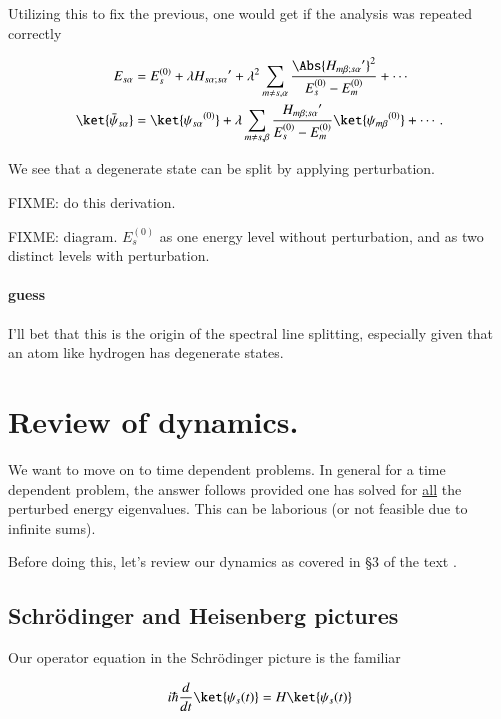 Utilizing this to fix the previous, one would get if the analysis was repeated correctly

\begin{align}\label{eqn:qmTwoL5:190}
E_{s\alpha} &= E_s^{(0)} + \lambda {H_{s\alpha ; s\alpha}}' 
+ \lambda^2 
\sum_{m \ne s, \alpha} 
\frac{\Abs{{H_{m \beta ; s \alpha}}'}^2 }
{ E_s^{(0)} - E_m^{(0)} } 
+ \cdots
\\
\ket{\bar{\psi}_{s \alpha}} &= \ket{{\psi_{s \alpha}}^{(0)}} 
+ \lambda
\sum_{m \ne s, \beta} 
\frac{{H_{m \beta ; s \alpha}}'}
{ E_s^{(0)} - E_m^{(0)} } \ket{{\psi_{m \beta}}^{(0)}}
+ \cdots.
\end{align}

We see that a degenerate state can be split by applying perturbation.

FIXME: do this derivation.

FIXME: diagram.  $E_s^{(0)}$ as one energy level without perturbation, and as two distinct levels with perturbation.

\paragraph{guess} I'll bet that this is the origin of the spectral line splitting, especially given that an atom like hydrogen has degenerate states.

\section{Review of dynamics.}

We want to move on to time dependent problems.  In general for a time dependent problem, the answer follows provided one has solved for \underline{all} the perturbed energy eigenvalues.  This can be laborious (or not feasible due to infinite sums).

Before doing this, let's review our dynamics as covered in \S 3 of the text \cite{desai2009quantum}.

\subsection{Schr\"{o}dinger and Heisenberg pictures}

Our operator equation in the Schr\"{o}dinger picture is the familiar

\begin{equation}\label{eqn:qmTwoL5:220}
i \hbar \frac{d}{dt} \ket{\psi_s(t)} = H \ket{\psi_s(t)}
\end{equation}

